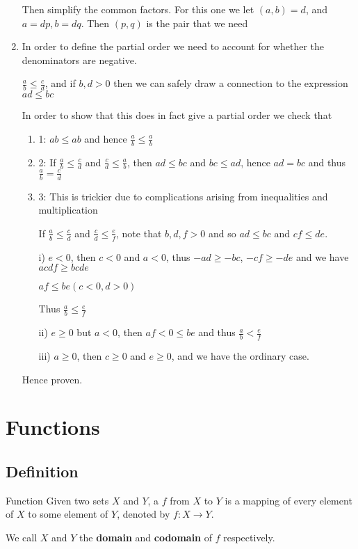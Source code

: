 \begin{solution}
\begin{enumerate}[label=(\alph*)]
Then simplify the common factors. For this one we let $(a,b)=d$, and $a=dp,b=dq$. Then $(p,q)$ is the pair that we need

\item In order to define the partial order we need to account for whether the denominators are negative.

$\frac{a}{b} \le \frac{c}{d}$, and if $b,d>0$ then we can safely draw a connection to the expression $ad \le bc$

In order to show that this does in fact give a partial order we check that
\begin{enumerate}
\item 1: $ab \le ab$ and hence $\frac{a}{b} \le \frac{a}{b}$

\item 2: If $\frac{a}{b} \le \frac{c}{d}$ and $\frac{c}{d} \le \frac{a}{b}$, then $ad \le bc$ and $bc \le ad$, hence $ad=bc$ and thus $\frac{a}{b}=\frac{c}{d}$

\item 3: This is trickier due to complications arising from inequalities and multiplication

If $\frac{a}{b}\le\frac{c}{d}$ and $\frac{c}{d}\le\frac{e}{f}$, note that $b,d,f>0$ and so $ad \le bc$ and $cf \le de$.

i) $e<0$, then $c<0$ and $a<0$, thus $-ad \ge -bc$, $-cf \ge -de$ and we have $acdf \ge bcde$

$af \le be (c<0,d>0)$

Thus $\frac{a}{b} \le \frac{e}{f}$

ii) $e \ge 0$ but $a<0$, then $af<0 \le be$ and thus $\frac{a}{b}<\frac{e}{f}$

iii) $a \ge 0$, then $c \ge 0$ and $e \ge 0$, and we have the ordinary case.
\end{enumerate}

Hence proven.
\end{enumerate}
\end{solution}
\pagebreak

\section{Functions}
\subsection{Definition}
\begin{defn}{Function}{}
Given two sets $X$ and $Y$, a  $f$ from $X$ to $Y$ is a mapping of every element of $X$ to some element of $Y$, denoted by $f:X\to Y$. 

We call $X$ and $Y$ the \textbf{domain} and \textbf{codomain} of $f$ respectively.
\end{defn}

